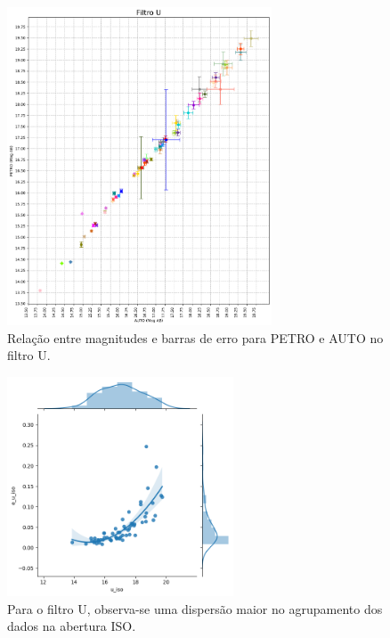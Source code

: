 \begin{figure}
  \centering 
  \includegraphics[width=0.7\textwidth]{Imagens/auto_petro.png} 
  \caption[Relação entre magnitudes e barras de erro para PETRO e AUTO no filtro U.]{Relação entre magnitudes e barras de erro para PETRO e AUTO no filtro U.}
  \label{fig:auto_petro} 
\end{figure}

\begin{figure}
  \centering 
  \includegraphics[width=0.6\textwidth]{Imagens/iso_linear.png} 
  \caption[Agrupamento das galáxias em relação à medição da magnitude e erro para a abertura ISO no filtro U.]{Para o filtro U, observa-se uma dispersão maior no agrupamento dos dados na abertura ISO.}
  \label{fig:iso_linear} 
\end{figure}


